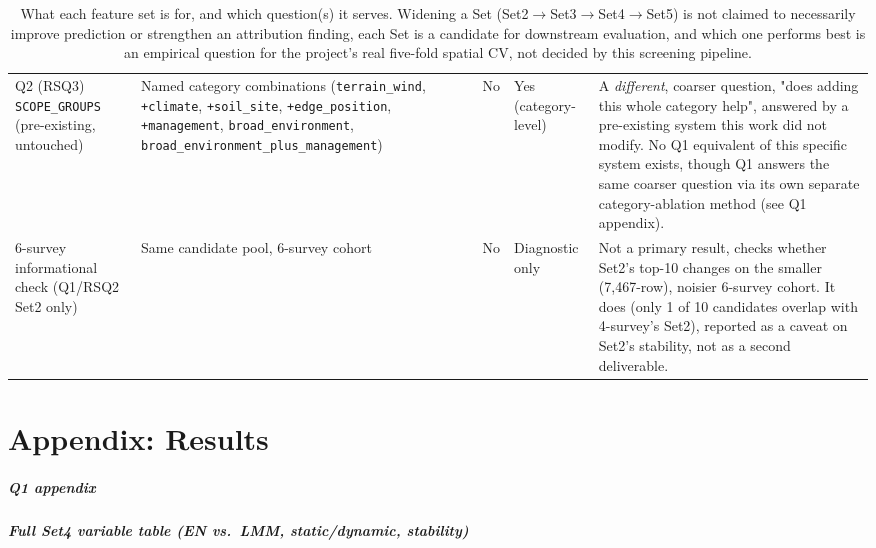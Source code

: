 \begin{table}[H]
\begin{tabularx}{\linewidth}{@{} p{2.6cm} >{\hsize=0.75\hsize\raggedright\arraybackslash}X p{2.1cm} p{1.5cm} >{\hsize=1.25\hsize\raggedright\arraybackslash}X @{}}
Q2 (RSQ3) \texttt{SCOPE\_GROUPS} (pre-existing, untouched) & Named category combinations (\texttt{terrain\_wind}, \texttt{+climate}, \texttt{+soil\_site}, \texttt{+edge\_position}, \texttt{+management}, \texttt{broad\_environment}, \texttt{broad\_environment\_plus\_management}) & No & Yes (category-level) & A \emph{different}, coarser question, "does adding this whole category help", answered by a pre-existing system this work did not modify. No Q1 equivalent of this specific system exists, though Q1 answers the same coarser question via its own separate category-ablation method (see Q1 appendix). \\
6-survey informational check (Q1/RSQ2 Set2 only) & Same candidate pool, 6-survey cohort & No & Diagnostic only & Not a primary result, checks whether Set2's top-10 changes on the smaller (7,467-row), noisier 6-survey cohort. It does (only 1 of 10 candidates overlap with 4-survey's Set2), reported as a caveat on Set2's stability, not as a second deliverable. \\
\bottomrule
\end{tabularx}
\caption{\small{What each feature set is for, and which question(s) it serves. Widening a Set (Set2$\to$Set3$\to$Set4$\to$Set5) is not claimed to necessarily improve prediction or strengthen an attribution finding, each Set is a candidate for downstream evaluation, and which one performs best is an empirical question for the project's real five-fold spatial CV, not decided by this screening pipeline.}}
\label{tab:feature-set-purpose}
\end{table}


\chapter{Appendix: Results}

\paragraph*{Q1 appendix}
\label{app:results-q1}

\paragraph*{Full Set4 variable table (EN vs.\ LMM, static/dynamic, stability)}
\label{app:nonlinearity-check}

